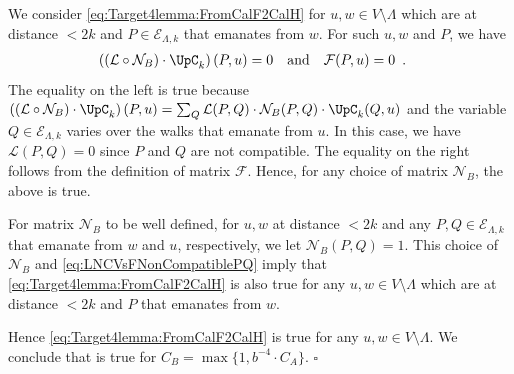 \documentclass[11pt,reqno]{amsart}
\numberwithin{equation}{section}
\newcommand{\cE}{{\mathcal{E}}}
\newcommand{\cF}{{\mathcal{F}}}
\newcommand{\cL}{{\mathcal{L}}}
\newcommand{\cN}{{\mathcal{N}}}
\newcommand{\amethyst}[1]{{\color{amethyst}#1} }
\newcommand{\blue}[1]{{\color{blue}#1}}
\newcommand{\bluepigment}[1]{{\color{blue(pigment)}#1}}
\newcommand{\goldenbrown}[1]{{\color{goldenbrown}#1}}
\newcommand{\iris}[1]{{\color{iris}#1}}
\newcommand{\red}[1]{{\color{red}#1}}
\newcommand{\rosegold}[1]{{\color{rosegold}#1}}
\newcommand{\ExtV}{\iris{\cE}}
\newcommand{\EdgeToV}{\UpC}
\renewcommand{\amethyst}[1]{#1}
\renewcommand{\blue}[1]{#1}
\renewcommand{\bluepigment}[1]{#1}
\renewcommand{\goldenbrown}[1]{#1}
\renewcommand{\iris}[1]{#1}
\renewcommand{\red}[1]{#1}
\renewcommand{\rosegold}[1]{#1}
\newcommand{\kk}{\bluepigment{k}}
\newcommand{\kP}{\goldenbrown{P}}
\newcommand{\kQ}{\amethyst{Q}}
\newcommand{\ku}{\red{u}}
\newcommand{\kw}{\blue{w}}
\renewcommand{\kk}{k}
\renewcommand{\kP}{P}
\renewcommand{\kQ}{Q}
\renewcommand{\ku}{u}
\renewcommand{\kw}{w}
\newcommand{\ExtdInfMatrix}{\rosegold{\cL}}
\newcommand{\SemExtdInfMatrix}{\cF}
\newcommand{\SymWeightMB}{\cN_B}
\begin{document}
We consider \eqref{eq:Target4lemma:FromCalF2CalH} for $\ku,\kw\in V\setminus \Lambda$ which are at distance $< 2\kk$
and $\kP\in \ExtV_{\Lambda,k}$ that emanates from $\kw$.
%
For such $\ku,\kw$ and $\kP$, we have
% 
\begin{align}\label{eq:LNCVsFNonCompatiblePQ}
\left(\left( \ExtdInfMatrix \circ \SymWeightMB \right)\cdot \EdgeToV_{\kk}\right)(\kP,\ku)&=0 &
\textrm{and} &&\SemExtdInfMatrix(\kP,\ku)&=0\enspace. 
\end{align}
The equality on the left is true because $\left(\left( \ExtdInfMatrix \circ \SymWeightMB \right)\cdot \EdgeToV_{\kk}\right)(\kP,\ku)=
\sum_{\kQ} \ExtdInfMatrix(\kP,\kQ) \cdot \SymWeightMB(\kP,\kQ) \cdot \EdgeToV_{\kk}(\kQ,\ku)$
%
and the variable $\kQ\in \ExtV_{\Lambda,k}$ varies over the walks that emanate from $\ku$. In this case, we have 
$\ExtdInfMatrix(\kP,\kQ)=0$ since  $\kP$ and $\kQ$ are not compatible. The equality on the right follows from the 
definition of matrix $\SemExtdInfMatrix$.  Hence, for any choice of matrix $\SymWeightMB$, the above is true. 

For matrix $\SymWeightMB$ to be well defined, for $\ku,\kw$ at distance $<2\kk$ and any $\kP, \kQ\in \ExtV_{\Lambda,k}$ 
that emanate from $\kw$ and $\ku$, respectively, 
we let $\SymWeightMB(\kP,\kQ)=1$.
%
This choice of $\SymWeightMB$ and \eqref{eq:LNCVsFNonCompatiblePQ} imply that \eqref{eq:Target4lemma:FromCalF2CalH} is also true
for any $\ku,\kw\in V\setminus \Lambda$ which are at distance $< 2\kk$ and $\kP$ that emanates from $\kw$.

Hence  \eqref{eq:Target4lemma:FromCalF2CalH} is true for any $\ku,\kw\in V\setminus \Lambda$. 
We conclude that   is true for $C_B=\max\{1, b^{-4}\cdot C_A\}$.
%
\hfill $\square$
\end{document}
